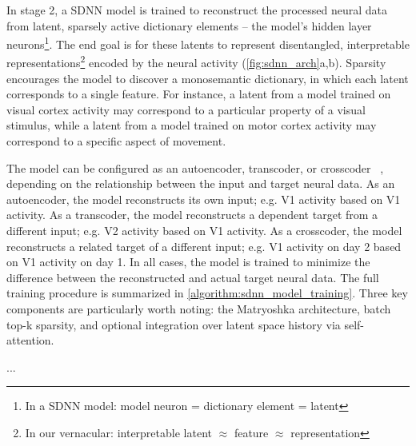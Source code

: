 In stage 2, a SDNN model is trained to reconstruct the processed neural data from latent, sparsely active dictionary elements -- the model's hidden layer neurons\footnote{In a SDNN model: model neuron = dictionary element = latent}. The end goal is for these latents to represent disentangled, interpretable representations\footnote{In our vernacular: interpretable latent $\approx$ feature $\approx$ representation} encoded by the neural activity (\autoref{fig:sdnn_arch}a,b). Sparsity encourages the model to discover a monosemantic dictionary, in which each latent corresponds to a single feature. For instance, a latent from a model trained on visual cortex activity may correspond to a particular property of a visual stimulus, while a latent from a model trained on motor cortex activity may correspond to a specific aspect of movement.

The model can be configured as an autoencoder, transcoder, or crosscoder ~\cite{lindsey_2024_crosscoders}, depending on the relationship between the input and target neural data. As an autoencoder, the model reconstructs its own input; e.g. V1 activity based on V1 activity. As a transcoder, the model reconstructs a dependent target from a different input; e.g. V2 activity based on V1 activity. As a crosscoder, the model reconstructs a related target of a different input; e.g. V1 activity on day 2 based on V1 activity on day 1. In all cases, the model is trained to minimize the difference between the reconstructed and actual target neural data. The full training procedure is summarized in \autoref{algorithm:sdnn_model_training}. Three key components are particularly worth noting: the Matryoshka architecture, batch top-k sparsity, and optional integration over latent space history via self-attention.

...

